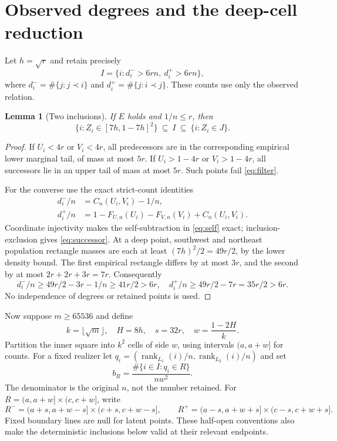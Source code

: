 \documentclass[11pt]{article}
\newtheorem{lemma}[theorem]{Lemma}
\theoremstyle{remark}
\newcommand{\rank}{\operatorname{rank}}
\begin{document}
\section{Observed degrees and the deep-cell reduction}
\label{sec:filter}
Let $h=\sqrt r$ and retain precisely
\begin{equation}\label{eq:filter}
 I=\{i:d_i^->6rn,\ d_i^+>6rn\},
\end{equation}
where $d_i^-=\#\{j:j\prec i\}$ and $d_i^+=\#\{j:i\prec j\}$.
These counts use only the observed relation.

\begin{lemma}[Two inclusions]\label{lem:deep}
If $E$ holds and $1/n\le r$, then
\[
 \{i:Z_i\in[7h,1-7h]^2\}\ \subseteq\ I\
 \subseteq\ \{i:Z_i\in J\}.
\]
\end{lemma}
\begin{proof}
If $U_i<4r$ or $V_i<4r$, all predecessors are in the corresponding
empirical lower marginal tail, of mass at most $5r$.
If $U_i>1-4r$ or $V_i>1-4r$, all successors lie in an upper tail
of mass at most $5r$. Such points fail \eqref{eq:filter}.

For the converse use the exact strict-count identities
\begin{align}
 d_i^-/n&=C_n(U_i,V_i)-1/n,\label{eq:self}\\
 d_i^+/n&=1-F_{U,n}(U_i)-F_{V,n}(V_i)+C_n(U_i,V_i).
 \label{eq:successor}
\end{align}
Coordinate injectivity makes the self-subtraction in \eqref{eq:self}
exact; inclusion-exclusion gives \eqref{eq:successor}.
At a deep point, southwest and northeast population rectangle
masses are each at least $(7h)^2/2=49r/2$, by the lower density bound.
The first empirical rectangle differs by at most $3r$, and the
second by at most $2r+2r+3r=7r$. Consequently
\[
 d_i^-/n\ge49r/2-3r-1/n\ge41r/2>6r,\quad
 d_i^+/n\ge49r/2-7r=35r/2>6r.
\]
No independence of degrees or retained points is used.
\end{proof}

Now suppose $m\ge65536$ and define
\begin{equation}\label{eq:parameters}
 k=\lfloor\sqrt m\rfloor,\quad H=8h,\quad s=32r,\quad
 w=\frac{1-2H}{k}.
\end{equation}
Partition the inner square into $k^2$ cells of side $w$, using
intervals $(a,a+w]$ for counts. For a fixed realizer let
$q_i=(\rank_{L_1}(i)/n,\rank_{L_2}(i)/n)$ and set
\begin{equation}\label{eq:histogram}
 b_R=\frac{\#\{i\in I:q_i\in R\}}{nw^2}.
\end{equation}
The denominator is the original $n$, not the number retained.
For $R=(a,a+w]\times(c,c+w]$, write
\[
 R^-=(a+s,a+w-s]\times(c+s,c+w-s],\qquad
 R^+=(a-s,a+w+s]\times(c-s,c+w+s].
\]
Fixed boundary lines are null for latent points. These half-open
conventions also make the deterministic inclusions below valid at
their relevant endpoints.
\end{document}
